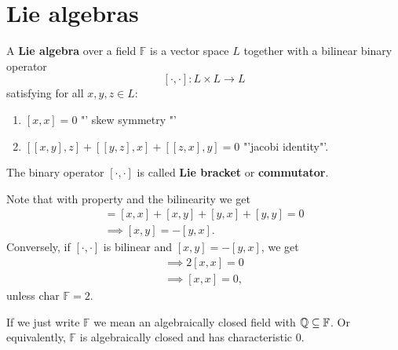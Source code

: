 \chapter{Lie algebras}
\newcommand{\F}{\mathbb{F}}
\newcommand{\liebracket}{[\cdot,\cdot]}
\newcommand{\End}{\textrm{End}}
\newcommand{\gl}{\mathfrak{gl}}
\newcommand{\GL}{\textrm{GL}}
\begin{definition}
    A \textbf{Lie algebra} over a field $\F$ 
    is a vector space $L$ together with a bilinear binary operator 
    $$ \liebracket : L \times L \to L $$ satisfying for all $x,y,z \in L$:
    \begin{enumerate}[label=(\arabic*)]
        \item $[x,x] = 0$ "' skew symmetry "'\label{item:skew}
        \item $[[x,y],z] + [[y,z],x] + [[z,x],y] = 0$ "'jacobi identity"'.
    \end{enumerate}

    The binary operator $\liebracket$ is called \textbf{Lie bracket} or \textbf{commutator}.
\end{definition}

\begin{remark}
    Note that with property  and the bilinearity we get
    \begin{align*}
        [(x+y),(x+y)] = [x,x] + [x,y] + [y,x] + [y,y] = 0 \\
        \implies [x,y] = -[y,x].
    \end{align*}
    Conversely, if $\liebracket$ is bilinear and $[x,y] = -[y,x]$, we get
    \begin{align*}
        \implies 2 [x,x] = 0\\
        \implies [x,x] = 0,
    \end{align*}
    unless $\textrm{char } \F = 2$.
\end{remark}

\begin{notation}
    If we just write $\F$ we mean an algebraically closed field with $\Q \subseteq \F$.
    Or equivalently, $\F$ is algebraically closed and has characteristic $0$.
\end{notation}

